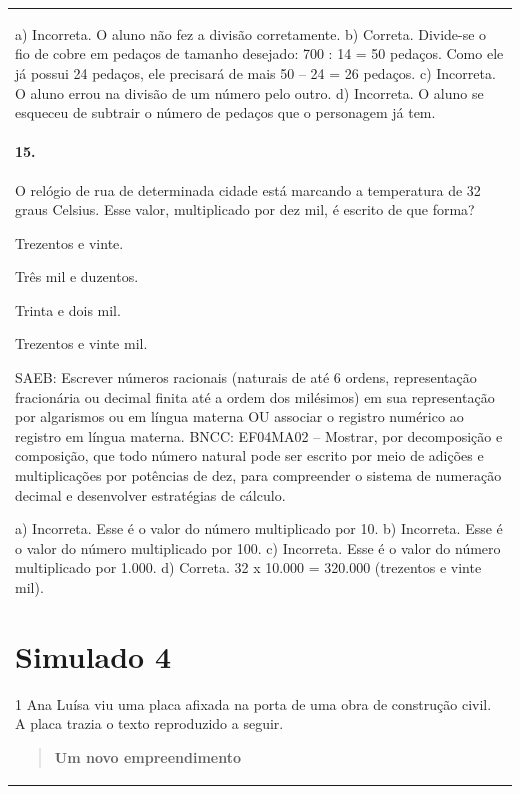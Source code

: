 \begin{mdframed}[linewidth=2pt,linecolor=salmao,roundcorner=2pt]
\begin{escolha}
{{{\begin{longtable}[]{@{}l@{}}
\begin{itemize}
{a) Incorreta. O aluno não fez a divisão corretamente.
b) Correta. Divide-se o fio de cobre em pedaços de tamanho desejado: 700 : 14 = 50
pedaços. Como ele já possui 24 pedaços, ele precisará de mais 50 -- 24 = 26 pedaços.
c) Incorreta. O aluno errou na divisão de um número pelo outro.
d) Incorreta. O aluno se esqueceu de subtrair o número de pedaços que o personagem já tem.

\subsubsection{15.}

O relógio de rua de determinada cidade está marcando a temperatura
de 32 graus Celsius. Esse valor, multiplicado por dez mil, é escrito de que forma?

\begin{escolha}
\item Trezentos e vinte.
\item Três mil e duzentos.
\item Trinta e dois mil.
\item Trezentos e vinte mil.
\end{escolha}

SAEB: Escrever números racionais (naturais de até 6 ordens, representação
fracionária ou decimal finita até a ordem dos milésimos) em sua
representação por algarismos ou em língua materna OU associar o registro
numérico ao registro em língua materna.
BNCC: EF04MA02 -- Mostrar, por decomposição e composição, que todo número natural pode ser escrito
por meio de adições e multiplicações por potências de dez, para compreender o sistema de
numeração decimal e desenvolver estratégias de cálculo.

a) Incorreta. Esse é o valor do número multiplicado por 10.
b) Incorreta. Esse é o valor do número multiplicado por 100.
c) Incorreta. Esse é o valor do número multiplicado por 1.000.
d) Correta. 32 x 10.000 = 320.000 (trezentos e vinte mil).

\chapter{Simulado 4}
\markboth{Simulado 4}{}

\num{1} Ana Luísa viu uma placa afixada na porta de uma obra de construção civil. A placa trazia o texto reproduzido a seguir.

\begin{quote}
\textbf{Um novo empreendimento}


\end{quote}}
\end{itemize}
\end{longtable}}}}
\end{escolha}
\end{mdframed}
